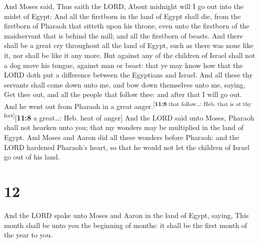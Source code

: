  And Moses said, Thus saith the LORD, About midnight will
I go out into the midst of Egypt:  And all the firstborn
in the land of Egypt shall die, from the firstborn of Pharaoh that
sitteth upon his throne, even unto the firstborn of the maidservant that
is behind the mill; and all the firstborn of beasts.  And
there shall be a great cry throughout all the land of Egypt, such as
there was none like it, nor shall be like it any more. 
But against any of the children of Israel shall not a dog move his
tongue, against man or beast: that ye may know how that the LORD doth
put a difference between the Egyptians and Israel.  And
all these thy servants shall come down unto me, and bow down themselves
unto me, saying, Get thee out, and all the people that follow thee: and
after that I will go out. And he went out from Pharaoh in a great
anger.\textsuperscript{{[}\textbf{11:8} that follow\ldots: Heb. that is
at thy feet{]}}{[}\textbf{11:8} a great\ldots: Heb. heat of anger{]}
 And the LORD said unto Moses, Pharaoh shall not hearken
unto you; that my wonders may be multiplied in the land of Egypt.
 And Moses and Aaron did all these wonders before
Pharaoh: and the LORD hardened Pharaoh's heart, so that he would not let
the children of Israel go out of his land.

\hypertarget{section-11}{%
\section{12}\label{section-11}}

 And the LORD spake unto Moses and Aaron in the land of
Egypt, saying,  This month shall be unto you the beginning
of months: it shall be the first month of the year to you.

